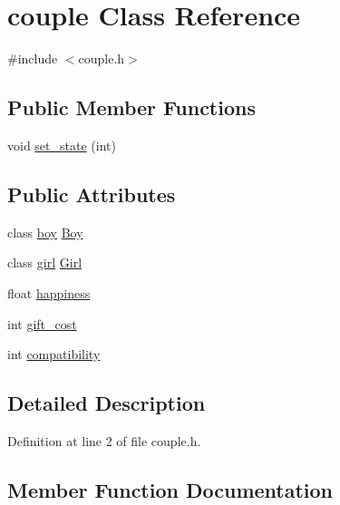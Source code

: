 \hypertarget{classcouple}{}\section{couple Class Reference}
\label{classcouple}


{\ttfamily \#include $<$couple.\+h$>$}

\subsection*{Public Member Functions}
\begin{DoxyCompactItemize}
\item 
void \hyperlink{classcouple_afdf77d3666e0235e49d6ba0cf2403f5c}{set\+\_\+state} (int)
\end{DoxyCompactItemize}
\subsection*{Public Attributes}
\begin{DoxyCompactItemize}
\item 
class \hyperlink{classboy}{boy} \hyperlink{classcouple_a2e7470aecd31a48d2ecac4e0043b5264}{Boy}
\item 
class \hyperlink{classgirl}{girl} \hyperlink{classcouple_a2ac499f5e234d65671e5734f6503a8e9}{Girl}
\item 
float \hyperlink{classcouple_a36ac5ab91759c51c757fd0159a45a7b2}{happiness}
\item 
int \hyperlink{classcouple_a6a447b1d07e6b3c5a0edb7424f57d52c}{gift\+\_\+cost}
\item 
int \hyperlink{classcouple_ac5a8c9e30fddfa733042af54cf87345f}{compatibility}
\end{DoxyCompactItemize}


\subsection{Detailed Description}


Definition at line 2 of file couple.\+h.



\subsection{Member Function Documentation}
\mbox{\label{classcouple_afdf77d3666e0235e49d6ba0cf2403f5c}} 
